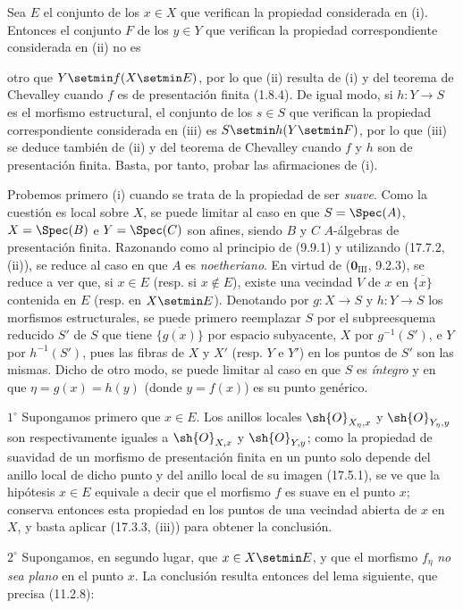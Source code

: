 Sea $E$ el conjunto de los $x\in X$ que verifican la propiedad considerada en (i). Entonces el conjunto $F$ de los $y\in Y$ que verifican la propiedad correspondiente considerada en (ii) no es


otro que $Y\setmin f(X\setmin E)$, por lo que (ii) resulta de (i) y del teorema de Chevalley cuando $f$ es de presentación finita (1.8.4). De igual modo, si $h:Y\to S$ es el morfismo estructural, el conjunto de los $s\in S$ que verifican la propiedad correspondiente considerada en (iii) es $S\setmin h(Y\setmin F)$, por lo que (iii) se deduce también de (ii) y del teorema de Chevalley cuando $f$ y $h$ son de presentación finita. Basta, por tanto, probar las afirmaciones de (i).

Probemos primero (i) cuando se trata de la propiedad de ser \emph{suave}. Como la cuestión es local sobre $X$, se puede limitar al caso en que $S=\Spec(A)$, $X=\Spec(B)$ e $Y=\Spec(C)$ son afines, siendo $B$ y $C$ $A$-álgebras de presentación finita. Razonando como al principio de (9.9.1) y utilizando (17.7.2, (ii)), se reduce al caso en que $A$ es \emph{noetheriano}. En virtud de ($\mathbf{0}_{\mathrm{III}}$, 9.2.3), se reduce a ver que, si $x\in E$ (resp. si $x\notin E$), existe una vecindad $V$ de $x$ en $\overline{\{x\}}$ contenida en $E$ (resp. en $X\setmin E$). Denotando por $g:X\to S$ y $h:Y\to S$ los morfismos estructurales, se puede primero reemplazar $S$ por el subpreesquema reducido $S'$ de $S$ que tiene $\overline{\{g(x)\}}$ por espacio subyacente, $X$ por $g^{-1}(S')$, e $Y$ por $h^{-1}(S')$, pues las fibras de $X$ y $X'$ (resp. $Y$ e $Y'$) en los puntos de $S'$ son las mismas. Dicho de otro modo, se puede limitar al caso en que $S$ es \emph{íntegro} y en que $\eta=g(x)=h(y)$ (donde $y=f(x)$) es su punto genérico.

$1^\circ$ Supongamos primero que $x\in E$. Los anillos locales $\sh{O}_{X_\eta,x}$ y $\sh{O}_{Y_\eta,y}$ son respectivamente iguales a $\sh{O}_{X,x}$ y $\sh{O}_{Y,y}$; como la propiedad de suavidad de un morfismo de presentación finita en un punto solo depende del anillo local de dicho punto y del anillo local de su imagen (17.5.1), se ve que la hipótesis $x\in E$ equivale a decir que el morfismo $f$ es suave en el punto $x$; conserva entonces esta propiedad en los puntos de una vecindad abierta de $x$ en $X$, y basta aplicar (17.3.3, (iii)) para obtener la conclusión.

$2^\circ$ Supongamos, en segundo lugar, que $x\in X\setmin E$, y que el morfismo $f_\eta$ \emph{no sea plano} en el punto $x$. La conclusión resulta entonces del lema siguiente, que precisa (11.2.8):

